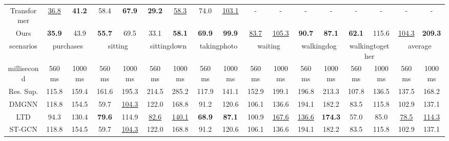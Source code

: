 \begin{table}[h]
{\begin{tabular}{c|cc|cc|cc|cc|cc|cc|cc|cc}
Transformer & \underline{36.8}          & \textbf{41.2}  & 58.4          & \textbf{67.9}  & \textbf{29.2}           & \underline{58.3}           & 74.0            & \underline{103.1}         & -             & -              & -              & -              & -                & -                & -              & -              \\
Ours   & \textbf{35.9} & 43.9           & \textbf{55.7} & 69.5           & 33.1           & \textbf{58.1}  & \textbf{69.9}   & \textbf{99.9} & \underline{83.7}          & \underline{105.3}          & \textbf{90.7}  & \textbf{87.1}  & \textbf{62.1}    & 115.6            & \underline{104.3}          & \textbf{209.3} \\ \hline
scenarios   & \multicolumn{2}{c|}{purchases}  & \multicolumn{2}{c|}{sitting}    & \multicolumn{2}{c|}{sittingdown} & \multicolumn{2}{c|}{takingphoto} & \multicolumn{2}{c|}{waiting}    & \multicolumn{2}{c|}{walkingdog}  & \multicolumn{2}{c|}{walkingtogether} & \multicolumn{2}{c}{average}         \\ \hline
millisecond & 560ms         & 1000ms         & 560ms         & 1000ms         & 560ms          & 1000ms         & 560ms           & 1000ms        & 560ms         & 1000ms         & 560ms          & 1000ms         & 560ms            & 1000ms           & 560ms          & 1000ms         \\ \hline
Res. Sup.   & 115.8        & 159.4         & 161.6       & 195.3        & 214.5        & 285.2         & 117.9         & 141.1       & 152.9       & 199.1        & 196.8        & 213.3        & 107.8          & 136.5          & 137.5          & 168.2          \\
DMGNN       & 118.8         & 154.5          & 59.7          & \underline{104.3}          & 122.0          & 168.8          & 91.2            & 120.6         & 106.1         & 136.6          & 194.1          & 182.2          & 83.5             & 115.8            & 102.9          & 137.1          \\
LTD   & 94.3          & 130.4          & \textbf{79.6}          & 114.9          & \underline{82.6}           & \underline{140.1}          & \textbf{68.9}            & \textbf{87.1}          & 100.9         & \underline{167.6}          & \underline{136.6}          & \textbf{174.3} & 57.0             & 85.0             & \underline{78.5}           & \underline{114.3}          \\
ST-GCN       & 118.8         & 154.5          & 59.7          & \underline{104.3}          & 122.0          & 168.8          & 91.2            & 120.6         & 106.1         & 136.6          & 194.1          & 182.2          & 83.5             & 115.8            & 102.9          & 137.1          \\

\end{tabular}}
\end{table}
